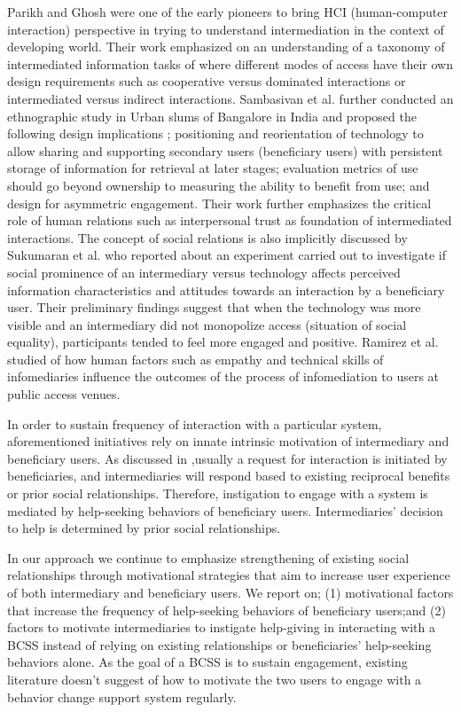 \documentclass{sig-alternate}
\begin{document}
Parikh and Ghosh \cite{parikh2006} were one of the early pioneers to bring HCI
(human-computer interaction) perspective in trying to understand
intermediation in the context of developing world. Their work emphasized on an
understanding of a taxonomy of intermediated information tasks of where
different modes of access have their own design requirements such as
cooperative versus dominated interactions or intermediated versus indirect
interactions. Sambasivan et al.\cite{sambasivan2010} further conducted an
ethnographic study in Urban slums of Bangalore in India and proposed the
following design implications ; positioning and reorientation of technology to
allow sharing and supporting secondary users (beneficiary users) with
persistent storage of information for retrieval at later stages; evaluation
metrics of use should go beyond ownership to measuring the ability to benefit
from use; and design for asymmetric engagement. Their work further emphasizes
the critical role of human relations such as interpersonal trust as foundation
of intermediated interactions. The concept of social relations is also
implicitly discussed by Sukumaran et al. \cite{sukumaran2009intermediated} who
reported about an experiment carried out to investigate if social prominence
of an intermediary versus technology affects perceived information
characteristics and attitudes towards an interaction by a beneficiary user.
Their preliminary findings suggest that when the technology was more visible
and an intermediary did not monopolize access (situation of social equality),
participants tended to feel more engaged and positive. Ramirez et al.
\cite{ramirez2013infomediaries} studied of how human factors such as empathy
and technical skills of infomediaries influence the outcomes of the process of
infomediation to users at public access venues.

In order to sustain frequency of interaction with a particular system,
aforementioned initiatives rely on innate intrinsic motivation of intermediary
and beneficiary users. As discussed in \cite{sambasivan2010},usually a request
for interaction is initiated by beneficiaries, and intermediaries will respond
based to existing reciprocal benefits or prior social relationships.
Therefore, instigation to engage with a system is mediated by help-seeking
behaviors of beneficiary users. Intermediaries' decision to help is determined
by prior social relationships.

In our approach we continue to emphasize strengthening of existing social
relationships through motivational strategies that aim to increase user
experience of both intermediary and beneficiary users. We report on; (1)
motivational factors that increase the frequency of help-seeking behaviors of
beneficiary users;and (2) factors to motivate intermediaries to instigate
help-giving in interacting with a BCSS instead of relying on existing
relationships or beneficiaries' help-seeking behaviors alone. As the goal of a
BCSS is to sustain engagement, existing literature doesn't suggest of how to
motivate the two users to engage with a behavior change support system
regularly.
\end{document}

